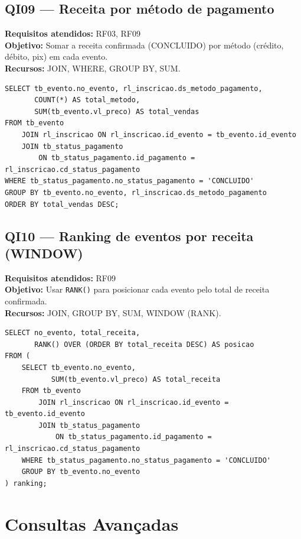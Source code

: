 \documentclass[12pt]{article}
\begin{document}
\subsection{QI09 --- Receita por método de pagamento}
\textbf{Requisitos atendidos:} RF03, RF09 \\
\textbf{Objetivo:} Somar a receita confirmada (CONCLUIDO) por método (crédito, débito, pix) em cada evento.\\
\textbf{Recursos:} JOIN, WHERE, GROUP BY, SUM.
\begin{lstlisting}[caption={QI09 -- Receita por método de pagamento.}]
SELECT tb_evento.no_evento, rl_inscricao.ds_metodo_pagamento,
       COUNT(*) AS total_metodo,
       SUM(tb_evento.vl_preco) AS total_vendas
FROM tb_evento
    JOIN rl_inscricao ON rl_inscricao.id_evento = tb_evento.id_evento
    JOIN tb_status_pagamento
        ON tb_status_pagamento.id_pagamento = rl_inscricao.cd_status_pagamento
WHERE tb_status_pagamento.no_status_pagamento = 'CONCLUIDO'
GROUP BY tb_evento.no_evento, rl_inscricao.ds_metodo_pagamento
ORDER BY total_vendas DESC;
\end{lstlisting}

\subsection{QI10 --- Ranking de eventos por receita (WINDOW)}
\textbf{Requisitos atendidos:} RF09 \\
\textbf{Objetivo:} Usar \texttt{RANK()} para posicionar cada evento pelo total de receita confirmada.\\
\textbf{Recursos:} JOIN, GROUP BY, SUM, WINDOW (RANK).
\begin{lstlisting}[caption={QI10 -- Ranking de receita com RANK().}]
SELECT no_evento, total_receita,
       RANK() OVER (ORDER BY total_receita DESC) AS posicao
FROM (
    SELECT tb_evento.no_evento,
           SUM(tb_evento.vl_preco) AS total_receita
    FROM tb_evento
        JOIN rl_inscricao ON rl_inscricao.id_evento = tb_evento.id_evento
        JOIN tb_status_pagamento
            ON tb_status_pagamento.id_pagamento = rl_inscricao.cd_status_pagamento
    WHERE tb_status_pagamento.no_status_pagamento = 'CONCLUIDO'
    GROUP BY tb_evento.no_evento
) ranking;
\end{lstlisting}

\section{Consultas Avançadas}
\label{sec:consultas-adv}
\end{document}
